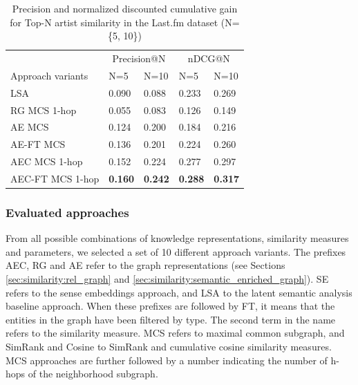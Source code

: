 \begin{table}
\small
\centering
	\begin{tabular}{ lllll }
 	\toprule
	& \multicolumn{2}{c}{Precision@N} & \multicolumn{2}{c}{nDCG@N} \\
\cmidrule(lr){2-3}
 \cmidrule(lr){4-5}
	Approach variants & N=5 & N=10 & N=5 & N=10 \\
	\midrule
LSA & 0.090 & 0.088 & 0.233 & 0.269 \\
RG MCS 1-hop & 0.055 & 0.083 & 0.126 & 0.149 \\
AE MCS & 0.124 & 0.200 & 0.184 & 0.216 \\
AE-FT MCS & 0.136 & 0.201 & 0.224 & 0.260 \\
AEC MCS 1-hop & 0.152 & 0.224 & 0.277 & 0.297 \\
AEC-FT MCS 1-hop & \textbf{0.160} & \textbf{0.242} & \textbf{0.288} & \textbf{0.317} \\
\bottomrule
	\end{tabular}
	\caption[Precision and nDCG for Top-N artist similarity in the Last.fm dataset.]{Precision and normalized discounted cumulative gain for Top-N artist similarity in the Last.fm dataset (N=\{5, 10\})}	
	\label{tbl:similarity:res_lastfm}
\end{table}

\subsubsection{Evaluated approaches}\label{sec:similarity:eval_approaches} %

From all possible combinations of knowledge representations, similarity measures and parameters, we selected a set of 10 different approach variants. The prefixes AEC, RG and AE refer to the graph representations (see Sections \ref{sec:similarity:rel_graph} and \ref{sec:similarity:semantic_enriched_graph}). %
SE refers to the sense embeddings approach, and LSA to the latent semantic analysis baseline approach. When these prefixes are followed by FT, it means that the entities in the graph have been filtered by type. The second term in the name refers to the similarity measure. MCS refers to maximal common subgraph, and SimRank and Cosine to SimRank and cumulative cosine similarity measures. MCS approaches are further followed by a number indicating the number of h-hops of the neighborhood subgraph.


